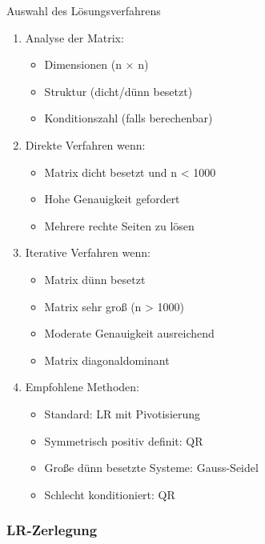 \begin{KR}{Auswahl des Lösungsverfahrens}
\begin{enumerate}
    \item Analyse der Matrix:
    \begin{itemize}
        \item Dimensionen (n × n)
        \item Struktur (dicht/dünn besetzt)
        \item Konditionszahl (falls berechenbar)
    \end{itemize}
    
    \item Direkte Verfahren wenn:
    \begin{itemize}
        \item Matrix dicht besetzt und n < 1000
        \item Hohe Genauigkeit gefordert
        \item Mehrere rechte Seiten zu lösen
    \end{itemize}
    
    \item Iterative Verfahren wenn:
    \begin{itemize}
        \item Matrix dünn besetzt
        \item Matrix sehr groß (n > 1000)
        \item Moderate Genauigkeit ausreichend
        \item Matrix diagonaldominant
    \end{itemize}
    
    \item Empfohlene Methoden:
    \begin{itemize}
        \item Standard: LR mit Pivotisierung
        \item Symmetrisch positiv definit: QR
        \item Große dünn besetzte Systeme: Gauss-Seidel
        \item Schlecht konditioniert: QR
    \end{itemize}
\end{enumerate}
\end{KR}

\subsubsection{LR-Zerlegung}

